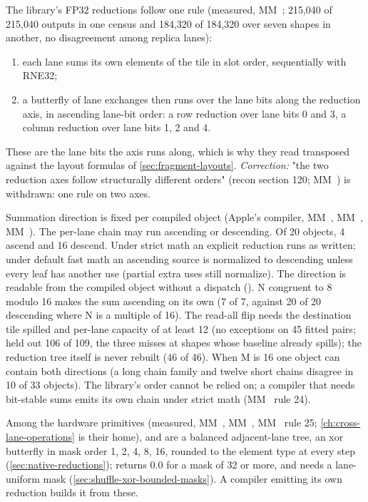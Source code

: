 The library's FP32 reductions follow one rule (measured, MM~; 215,040 of 215,040 outputs in one census and
184,320 of 184,320 over seven shapes in another, no disagreement among replica lanes):

\begin{enumerate}
\def\labelenumi{\arabic{enumi}.}
\item each lane sums its own elements of the tile in slot order, sequentially with RNE32;
\item a butterfly of lane exchanges then runs over the lane bits along the reduction axis, in ascending lane-bit order: a
  row reduction over lane bits 0 and 3, a column reduction over lane bits 1, 2 and 4.
\end{enumerate}

These are the lane bits the axis runs along, which is why they read transposed against the layout formulas of
\cref{sec:fragment-layouts}. \emph{Correction:} "the two reduction axes follow structurally different orders" (recon section 120; MM~) is
withdrawn: one rule on two axes.

Summation direction is fixed per compiled object (Apple's compiler, MM~, MM~, MM~). The per-lane
chain may run ascending or descending. Of 20 objects, 4 ascend and 16 descend. Under strict math an explicit reduction
runs as written; under default fast math an ascending source is normalized to descending unless every leaf has another
use (partial extra uses still normalize). The direction is readable from the compiled object without a dispatch
(). N congruent to 8 modulo 16 makes the sum ascending on its own (7 of 7, against 20 of 20
descending where N is a multiple of 16). The read-all flip needs the destination tile spilled and per-lane capacity
of at least 12 (no exceptions on 45 fitted pairs; held out 106 of 109, the three misses at shapes whose baseline already
spills); the reduction tree itself is never rebuilt (46 of 46). When M is 16 one object can contain both directions (a long
chain family and twelve short chains disagree in 10 of 33 objects). The library's order cannot be relied on; a compiler that
needs bit-stable sums emits its own chain under strict math (MM~ rule 24).

Among the hardware primitives (measured, MM~, MM~, MM~ rule 25; \cref{ch:cross-lane-operations} is their home),  and
 are a balanced adjacent-lane tree, an xor butterfly in mask order 1, 2, 4, 8, 16, rounded to
the element type at every step (\cref{sec:native-reductions});  returns 0.0 for a mask of 32
or more, and  needs a lane-uniform mask (\cref{sec:shuffle-xor-bounded-masks}). A compiler emitting its
own reduction builds it from these.

